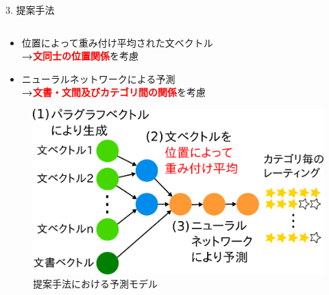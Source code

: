 \documentclass[unicode,10pt]{beamer}
\newlength{\mycolumnwidth}
\newcommand{\arrow}{\textcolor{ttiblue}{\textbf{→}}\hspace{1ex}}
\newcommand{\itemtitle}[1]{\textbf{#1}\\}
\newcommand{\fire}[1]{\textcolor{red}{\textbf{#1}}}
\begin{document}
\begin{frame}
\begin{block}{3. 提案手法}
  \begin{columns}[onlytextwidth,t]
    \begin{column}{\mycolumnwidth}
          \begin{itemize}
            \item 位置によって重み付け平均された文ベクトル \\
                  \arrow \fire{文同士の位置関係}を考慮
            \item ニューラルネットワークによる予測 \\
                  \arrow \fire{文書・文間及びカテゴリ間の関係}を考慮
          \end{itemize}
      \begin{figure}
        \includegraphics[width=0.9\linewidth]
                        {fig/model_with_detailed_processes.pdf}
        \caption*{提案手法における予測モデル}
      \end{figure}
    \end{column}


\end{columns}
\end{block}
\end{frame}
\end{document}
